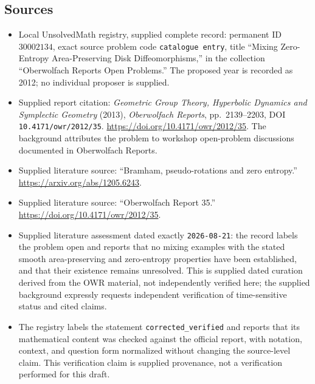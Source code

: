 \documentclass[11pt]{article}
\begin{document}
\subsection{Sources}
\begin{itemize}
\item Local UnsolvedMath registry, supplied complete record: permanent ID \(30002134\), exact source problem code \texttt{catalogue entry}, title ``Mixing Zero-Entropy Area-Preserving Disk Diffeomorphisms,'' in the collection ``Oberwolfach Reports Open Problems.'' The proposed year is recorded as 2012; no individual proposer is supplied.
\item Supplied report citation: \emph{Geometric Group Theory, Hyperbolic Dynamics and Symplectic Geometry} (2013), \emph{Oberwolfach Reports}, pp.\ 2139--2203, DOI \texttt{10.4171/owr/2012/35}. \url{https://doi.org/10.4171/owr/2012/35}. The background attributes the problem to workshop open-problem discussions documented in Oberwolfach Reports.
\item Supplied literature source: ``Bramham, pseudo-rotations and zero entropy.'' \url{https://arxiv.org/abs/1205.6243}.
\item Supplied literature source: ``Oberwolfach Report 35.'' \url{https://doi.org/10.4171/owr/2012/35}.
\item Supplied literature assessment dated exactly \texttt{2026-08-21}: the record labels the problem open and reports that no mixing examples with the stated smooth area-preserving and zero-entropy properties have been established, and that their existence remains unresolved. This is supplied dated curation derived from the OWR material, not independently verified here; the supplied background expressly requests independent verification of time-sensitive status and cited claims.
\item The registry labels the statement \texttt{corrected\_verified} and reports that its mathematical content was checked against the official report, with notation, context, and question form normalized without changing the source-level claim. This verification claim is supplied provenance, not a verification performed for this draft.
\end{itemize}
\end{document}

